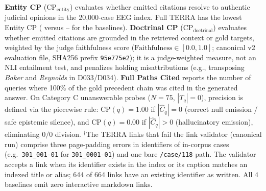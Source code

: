 \begin{table}[!t]
\textbf{Entity CP} ($\text{CP}_{\text{entity}}$) evaluates whether emitted citations resolve to authentic judicial opinions in the 20,000-case EEG index. Full TERRA has the lowest Entity CP (\CatBTerraEntityCitationPrecision{} versus \CatBGraphRAGEntityCitationPrecision{}--\CatBDirectEntityCitationPrecision{} for the baselines). 
\textbf{Doctrinal CP} ($\text{CP}_{\text{doctrinal}}$) evaluates whether emitted citations are grounded in the retrieved context or gold targets, weighted by the judge faithfulness score ($\text{Faithfulness} \in [0.0, 1.0]$; canonical v2 evaluation file, SHA256 prefix \texttt{95e775e2}); it is a judge-weighted measure, not an NLI entailment test, and penalizes holding misattributions (e.g., transposing \textit{Baker} and \textit{Reynolds} in D033/D034). 
\textbf{Full Paths Cited} reports the number of queries where 100\% of the gold precedent chain was cited in the generated answer. 
On Category C unanswerable probes ($N=75$, $|T_q|=0$), precision is defined via the piecewise rule: $\text{CP}(q) = 1.00$ if $|\hat{C}_q|=0$ (correct null emission / safe epistemic silence), and $\text{CP}(q) = 0.00$ if $|\hat{C}_q|>0$ (hallucinatory emission), eliminating $0/0$ division. 
$^\dagger$The \TerraBrokenMarkdownLinks{} TERRA links that fail the link validator (canonical run) comprise three page-padding errors in identifiers of in-corpus cases (e.g.\ \texttt{301\_001-01} for \texttt{301\_0001-01}) and one bare \texttt{/case/118} path. The validator accepts a link when its identifier exists in the index or its caption matches an indexed title or alias; 644 of 664 links have an existing identifier as written. All 4 baselines emit zero interactive markdown links.
\end{table}

